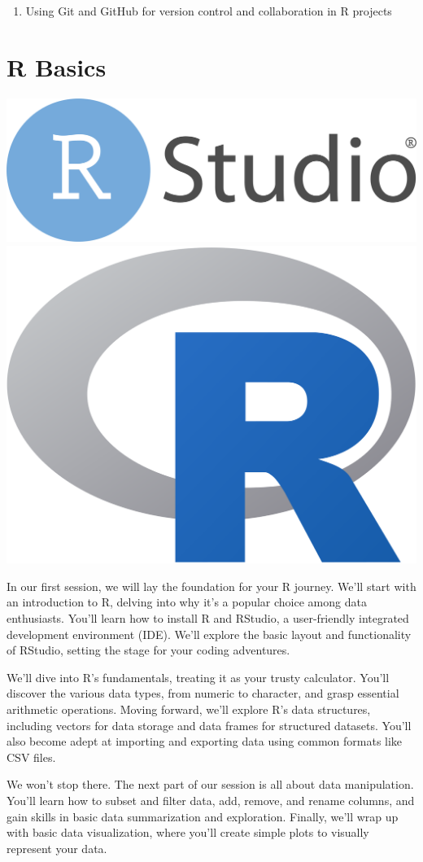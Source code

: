 \documentclass[
]{book}
\providecommand{\tightlist}{%
  \setlength{\itemsep}{0pt}\setlength{\parskip}{0pt}}
\begin{document}
\begin{enumerate}
\def\labelenumi{\arabic{enumi}.}
\tightlist
\item
  Using Git and GitHub for version control and collaboration in R projects
\end{enumerate}

\chapter*{R Basics}\label{r-basics}

\includegraphics[width=0.4\linewidth,height=0.2\textheight]{images/RStudio-Logo} \includegraphics[width=0.4\linewidth,height=0.2\textheight]{images/R_logo}

In our first session, we will lay the foundation for your R journey. We'll start with an introduction to R, delving into why it's a popular choice among data enthusiasts. You'll learn how to install R and RStudio, a user-friendly integrated development environment (IDE). We'll explore the basic layout and functionality of RStudio, setting the stage for your coding adventures.

We'll dive into R's fundamentals, treating it as your trusty calculator. You'll discover the various data types, from numeric to character, and grasp essential arithmetic operations. Moving forward, we'll explore R's data structures, including vectors for data storage and data frames for structured datasets. You'll also become adept at importing and exporting data using common formats like CSV files.

We won't stop there. The next part of our session is all about data manipulation. You'll learn how to subset and filter data, add, remove, and rename columns, and gain skills in basic data summarization and exploration. Finally, we'll wrap up with basic data visualization, where you'll create simple plots to visually represent your data.
\end{document}
